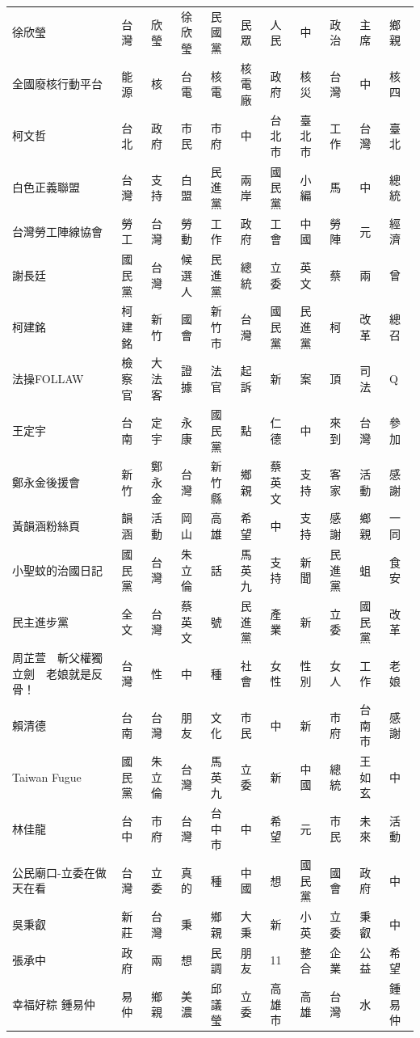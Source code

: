 \documentclass[letterpaper, 10pt, conference]{ieeeconf}   %
\begin{document}
\begin{CJK}{UTF8}{bsmi}
\begin{longtable}[c]{@{}L{2.45cm}L{1.1cm}L{1.1cm}L{1.1cm}L{1.1cm}L{1.1cm}L{1.1cm}L{1.1cm}L{1.1cm}L{1.1cm}L{1.1cm}@{}}
徐欣瑩 & 台灣 & 欣瑩 & 徐欣瑩 & 民國黨 & 民眾 & 人民 & 中 & 政治 & 主席 & 鄉親 \\
全國廢核行動平台 & 能源 & 核 & 台電 & 核電 & 核電廠 & 政府 & 核災 & 台灣 & 中 & 核四 \\
柯文哲 & 台北 & 政府 & 市民 & 市府 & 中 & 台北市 & 臺北市 & 工作 & 台灣 & 臺北 \\
白色正義聯盟 & 台灣 & 支持 & 白盟 & 民進黨 & 兩岸 & 國民黨 & 小編 & 馬 & 中 & 總統 \\
台灣勞工陣線協會 & 勞工 & 台灣 & 勞動 & 工作 & 政府 & 工會 & 中國 & 勞陣 & 元 & 經濟 \\
謝長廷 & 國民黨 & 台灣 & 候選人 & 民進黨 & 總統 & 立委 & 英文 & 蔡 & 兩 & 曾 \\
柯建銘 & 柯建銘 & 新竹 & 國會 & 新竹市 & 台灣 & 國民黨 & 民進黨 & 柯 & 改革 & 總召 \\
法操FOLLAW & 檢察官 & 大法客 & 證據 & 法官 & 起訴 & 新 & 案 & 頂 & 司法 & Q \\
王定宇 & 台南 & 定宇 & 永康 & 國民黨 & 點 & 仁德 & 中 & 來到 & 台灣 & 參加 \\
鄭永金後援會 & 新竹 & 鄭永金 & 台灣 & 新竹縣 & 鄉親 & 蔡英文 & 支持 & 客家 & 活動 & 感謝 \\
黃韻涵粉絲頁 & 韻涵 & 活動 & 岡山 & 高雄 & 希望 & 中 & 支持 & 感謝 & 鄉親 & 一同 \\
小聖蚊的治國日記 & 國民黨 & 台灣 & 朱立倫 & 話 & 馬英九 & 支持 & 新聞 & 民進黨 & 蛆 & 食安 \\
民主進步黨 & 全文 & 台灣 & 蔡英文 & 號 & 民進黨 & 產業 & 新 & 立委 & 國民黨 & 改革 \\
周芷萱　斬父權獨立劍　老娘就是反骨！ & 台灣 & 性 & 中 & 種 & 社會 & 女性 & 性別 & 女人 & 工作 & 老娘 \\
賴清德 & 台南 & 台灣 & 朋友 & 文化 & 市民 & 中 & 新 & 市府 & 台南市 & 感謝 \\
Taiwan Fugue & 國民黨 & 朱立倫 & 台灣 & 馬英九 & 立委 & 新 & 中國 & 總統 & 王如玄 & 中 \\
林佳龍 & 台中 & 市府 & 台灣 & 台中市 & 中 & 希望 & 元 & 市民 & 未來 & 活動 \\
公民廟口-立委在做天在看 & 台灣 & 立委 & 真的 & 種 & 中國 & 想 & 國民黨 & 國會 & 政府 & 中 \\
吳秉叡 & 新莊 & 台灣 & 秉 & 鄉親 & 大秉 & 新 & 小英 & 立委 & 秉叡 & 中 \\
張承中 & 政府 & 兩 & 想 & 民調 & 朋友 & 11 & 整合 & 企業 & 公益 & 希望 \\
幸福好粽 鍾易仲 & 易仲 & 鄉親 & 美濃 & 邱議瑩 & 立委 & 高雄市 & 高雄 & 台灣 & 水 & 鍾易仲 \\

\end{longtable}
\end{CJK}
\end{document}
